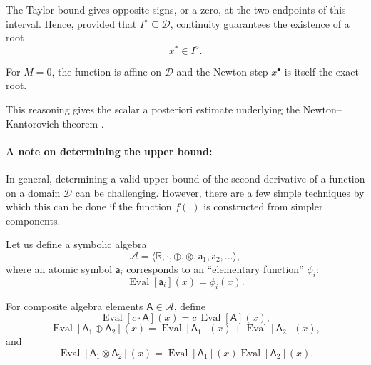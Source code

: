 \documentclass{article}
\theoremstyle{definition}
\begin{document}
The Taylor bound gives opposite signs, or a zero, at the two endpoints
of this interval. Hence, provided that $I^\diamond\subseteq\mathcal{D}$,
continuity guarantees the existence of a root
\begin{equation}
    x^*\in I^\diamond.
\end{equation}

For $M=0$, the function is affine on $\mathcal{D}$ and the Newton step
$x^\bullet$ is itself the exact root.

This reasoning gives the scalar a posteriori estimate underlying the
Newton--Kantorovich theorem
\cite{book:OrtegaIterativeSolutionOfNonlinearEquations}.


\paragraph{A note on determining the upper bound:}

In general, determining a valid upper bound of the second derivative of
a function on a domain $\mathcal{D}$ can be challenging. However, there
are a few simple techniques by which this can be done if the function
$f(.)$ is constructed from simpler components.

Let us define a symbolic algebra
\begin{equation}
    \mathcal{A}
    =
    \langle
        \mathbb{R},
        \cdot,
        \oplus,
        \otimes,
        \mathsf{a}_1,
        \mathsf{a}_2,
        \dots
    \rangle,
\end{equation}
where an atomic symbol $\mathsf{a}_i$ corresponds to an ``elementary
function'' $\phi_i$:
\begin{equation}
    \operatorname{Eval}[\mathsf{a}_i](x)
    =
    \phi_i(x).
\end{equation}

For composite algebra elements $\mathsf{A}\in\mathcal{A}$, define
\begin{equation}
    \operatorname{Eval}[c\cdot\mathsf{A}](x)
    =
    c\,\operatorname{Eval}[\mathsf{A}](x),
\end{equation}
\begin{equation}
    \operatorname{Eval}[
        \mathsf{A}_1\oplus\mathsf{A}_2
    ](x)
    =
    \operatorname{Eval}[\mathsf{A}_1](x)
    +
    \operatorname{Eval}[\mathsf{A}_2](x),
\end{equation}
and
\begin{equation}
    \operatorname{Eval}[
        \mathsf{A}_1\otimes\mathsf{A}_2
    ](x)
    =
    \operatorname{Eval}[\mathsf{A}_1](x)
    \operatorname{Eval}[\mathsf{A}_2](x).
\end{equation}
\end{document}
